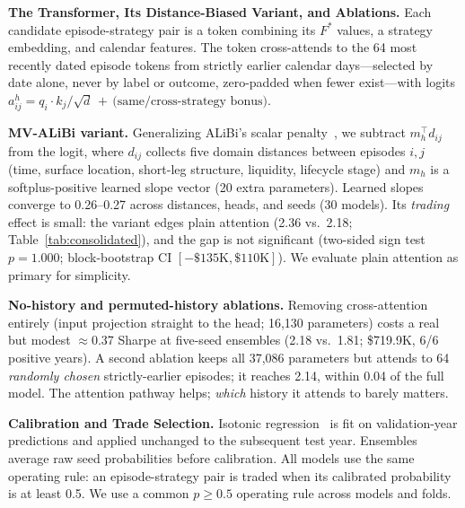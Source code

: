 \documentclass[sigconf,review,anonymous]{acmart}
\begin{document}
\medskip\noindent\textbf{The Transformer, Its Distance-Biased Variant, and Ablations.}
\label{sec:transformer}
Each candidate episode-strategy pair is a token combining its $F^{\ast}$ values, a strategy embedding, and calendar features. The token cross-attends to the 64 most recently dated episode tokens from strictly earlier calendar days---selected by date alone, never by label or outcome, zero-padded when fewer exist---with logits
$a^{h}_{ij}=q_i\!\cdot\!k_j/\sqrt{d}\,+\,\text{(same/cross-strategy bonus)}$.

\noindent\textbf{MV-ALiBi variant.} Generalizing ALiBi's scalar penalty~\cite{press2022alibi}, we subtract $m_h^{\top}d_{ij}$ from the logit, where $d_{ij}$ collects five domain distances between episodes $i,j$ (time, surface location, short-leg structure, liquidity, lifecycle stage) and $m_h$ is a softplus-positive learned slope vector (20 extra parameters). Learned slopes converge to 0.26--0.27 across distances, heads, and seeds (30 models). Its \emph{trading} effect is small: the variant edges plain attention (2.36 vs.\ 2.18; Table~\ref{tab:consolidated}), and the gap is not significant (two-sided sign test $p=1.000$; block-bootstrap CI $[-\$135\text{K},\$110\text{K}]$). We evaluate plain attention as primary for simplicity.

\noindent\textbf{No-history and permuted-history ablations.}
\label{sec:ablations}
Removing cross-attention entirely (input projection straight to the head; 16{,}130 parameters) costs a real but modest $\approx$0.37 Sharpe at five-seed ensembles (2.18 vs.\ 1.81; \$719.9K, 6/6 positive years). A second ablation keeps all 37{,}086 parameters but attends to 64 \emph{randomly chosen} strictly-earlier episodes; it reaches 2.14, within 0.04 of the full model. The attention pathway helps; \emph{which} history it attends to barely matters.

\medskip\noindent\textbf{Calibration and Trade Selection.}
\label{sec:calibration}
Isotonic regression~\cite{zadrozny2002transforming} is fit on validation-year predictions and applied unchanged to the subsequent test year. Ensembles average raw seed probabilities before calibration. All models use the same operating rule: an episode-strategy pair is traded when its calibrated probability is at least 0.5. We use a common $p\ge0.5$ operating rule across models and folds.
\end{document}
